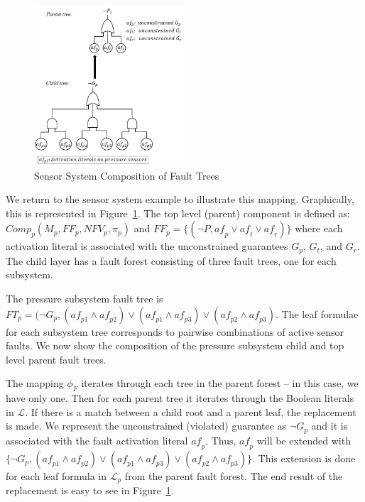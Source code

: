 \begin{figure}[h!]
	\begin{center}
		\includegraphics[width=0.5\textwidth]{images/faultCompEx.JPG}
	\end{center}
	\caption{Sensor System Composition of Fault Trees}
	\label{fig:sensorSysComp}
\end{figure}
We return to the sensor system example to illustrate this mapping. Graphically, this is represented in Figure~\ref{fig:sensorSysComp}.  The top level (parent) component is defined as: $\mathit{Comp}_p (M_p, \mathit{FF}_p, \mathit{NFV}_p, \pi_p)$ and $\mathit{FF}_p = \{(\neg P, \mathit{af}_p \lor \mathit{af}_t \lor \mathit{af}_r)\}$ where each activation literal is associated with the unconstrained guarantees $G_p$, $G_t$, and $G_r$. The child layer has a fault forest consisting of three fault trees, one for each subsystem. 

The pressure subsystem fault tree is $\mathit{FT}_{p} = (\neg G_p, (\mathit{af}_{p1} \land \mathit{af}_{p2}) \lor (\mathit{af}_{p1} \land \mathit{af}_{p3}) \lor (\mathit{af}_{p2} \land \mathit{af}_{p3}) $. The leaf formulae for each subsystem tree corresponds to pairwise combinations of active sensor faults. We now show the composition of the pressure subsystem child and top level parent fault trees. 

The mapping $\phi_F$ iterates through each tree in the parent forest -- in this case, we have only one. Then for each parent tree it iterates through the Boolean literals in $\mathcal{L}$. If there is a match between a child root and a parent leaf, the replacement is made. We represent the unconstrained (violated) guarantee as $\neg G_p$ and it is associated with the fault activation literal $\mathit{af}_p$. Thus, $\mathit{af}_p$ will be extended with $\{\neg G_p, (\mathit{af}_{p1} \land \mathit{af}_{p2}) \lor (\mathit{af}_{p1} \land \mathit{af}_{p3}) \lor (\mathit{af}_{p2} \land \mathit{af}_{p3})\}$. This extension is done for each leaf formula in $\mathcal{L}_p$ from the parent fault forest. The end result of the replacement is easy to see in Figure~\ref{fig:sensorSysComp}.


